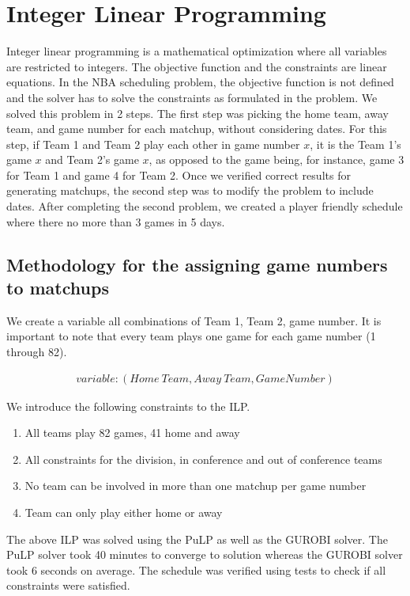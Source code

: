 \documentclass{article}
\begin{document}
	\section{Integer Linear Programming}
	Integer linear programming is a mathematical optimization where all variables are restricted to integers. The objective function and the constraints are linear equations. In the NBA scheduling problem, the objective function is not defined and the solver has to solve the constraints as formulated in the problem. We solved this problem in 2 steps. The first step was picking the home team, away team, and game number for each matchup, without considering dates.  For this step, if Team 1 and Team 2 play each other in game number $x$, it is the Team 1's game $x$ and Team 2's game $x$, as opposed to the game being, for instance, game 3 for Team 1 and game 4 for Team 2.  Once we verified correct results for generating matchups, the second step was to modify the problem to include dates.  After completing the second problem, we created a player friendly schedule where there no more than 3 games in 5 days.

	\subsection{Methodology for the assigning game numbers to matchups}
	We create a variable all combinations of Team 1, Team 2, game number. It is important to note that every team plays one game for each game number (1 through 82). 

	\begin{eqnarray*}
		variable : (Home \ Team, Away \ Team, Game Number)
	\end{eqnarray*}

	We introduce the following constraints to the ILP.
	\begin{enumerate}
		\item All teams play 82 games, 41 home and away
		\item All constraints for the division, in conference and out of conference teams
		\item No team can be involved in more than one matchup per game number
		\item Team can only play either home or away
	\end{enumerate}
	The above ILP was solved using the PuLP as well as the GUROBI solver. The PuLP solver took 40 minutes to converge to solution whereas the GUROBI solver took 6 seconds on average. The schedule was verified using tests to check if all constraints were satisfied.
\end{document}
